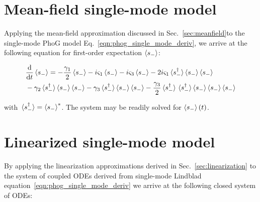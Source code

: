 \clearpage
\section{Mean-field single-mode model}\label{appendix:single_mode_mean_field}
Applying the mean-field approximation discussed in Sec.~\ref{sec:meanfield}to the single-mode PhoG model Eq.~\ref{eqn:phog_single_mode_deriv}, we arrive at the following equation for first-order expectation $\ev{s_-}$:

\begin{align}
&\ddt \ev{s_-} = - \frac{\gamma_1}{2} \ev{s_-} - i \varsigma_1 \ev{s_-} - i \varsigma_3 \ev{s_-} - 2 i \varsigma_1 \ev*{s_-^\dagger} \ev{s_-} \ev{s_-}  \notag \\
%
&- \gamma_2 \ev*{s_-^\dagger} \ev{s_-} \ev{s_-} - \gamma_3 \ev*{s_-^\dagger} \ev{s_-} \ev{s_-} - \frac{\gamma_3}{2} \ev*{s_-^\dagger} \ev*{s_-^\dagger} \ev{s_-} \ev{s_-} \ev{s_-}
\end{align}

\noindent with $\ev*{s_-^\dagger} = \ev{s_-}^*$. The system may be readily solved for $\ev{s_-}\left(t\right)$.

\section{Linearized single-mode model}\label{appendix:single_mode_linear}
By applying the linearization approximations derived in Sec.~\ref{sec:linearization} to the system of coupled ODEs derived from single-mode Lindblad equation~\ref{eqn:phog_single_mode_deriv} we arrive at the following closed system of ODEs:


